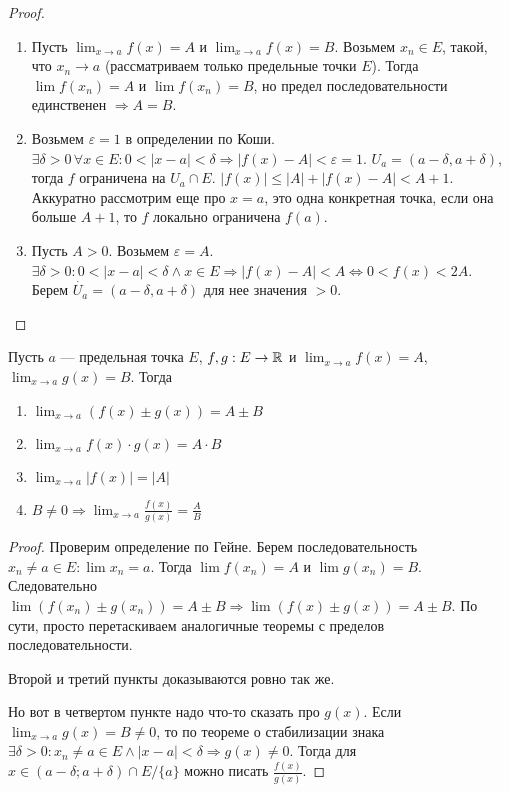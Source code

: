 \begin{proof}
    \slashn
    \begin{enumerate}
        \item Пусть  $\lim_{x\to a} f(x) = A$ и  $\lim_{x\to a} f(x) = B$. Возьмем  $x_n \in E$, такой, что  $x_n \to a$ (рассматриваем только предельные точки $E$). Тогда $\lim f(x_n) = A$ и  $\lim f(x_n) = B$, но предел последовательности единственен $\Rightarrow A=B$.  
	\item Возьмем $\varepsilon = 1$ в определении по Коши.  $\exists \delta > 0\, \forall x \in E: 0 < |x-a| < \delta \Rightarrow |f(x) - A| < \varepsilon = 1$. $U_a = (a - \delta, a + \delta)$, тогда  $f$ ограничена на  $U_a \cap E$.  $|f(x)| \le |A| + |f(x) - A| < A + 1$. Аккуратно рассмотрим еще про $x = a$, это одна конкретная точка, если она больше $A + 1$, то $f$ локально ограничена $f(a)$.
	\item Пусть $A > 0$. Возьмем  $\varepsilon = A$.  $\exists \delta > 0: 0 < |x-a| < \delta \land x \in E \Rightarrow |f(x) - A| < A \iff 0 < f(x) < 2A$. Берем  $\dot{U_a} = (a-\delta, a+\delta)$ для нее значения  $>0$.
    \end{enumerate}
\end{proof}
\begin{theorem}
    Пусть $a$ --- предельная точка  $E$,  $f, g: E \to \mathbb{R}$ и  $\lim_{x\to a} f(x)=A$,  $\lim_{x\to a} g(x)=B$. Тогда 
    \begin{enumerate}
        \item $\lim_{x\to a} (f(x) \pm g(x)) = A \pm B$
        \item $\lim_{x\to a} f(x) \cdot g(x) = A \cdot B$
        \item $\lim_{x\to a} |f(x)| = |A|$
        \item $B \neq 0 \Rightarrow \lim_{x\to a} \frac{f(x)}{g(x)} = \frac{A}{B}$
    \end{enumerate}
\end{theorem}
\begin{proof}
    Проверим определение по Гейне. Берем последовательность $x_n \neq a \in E: \lim x_n = a$. Тогда  $\lim f(x_n) = A$  и  $\lim g(x_n) = B$. Следовательно  $\lim (f(x_n) \pm g(x_n)) = A \pm B \Rightarrow \lim (f(x) \pm g(x)) = A \pm B$. По сути, просто перетаскиваем аналогичные теоремы с пределов последовательности.

    Второй и третий пункты доказываются ровно так же.

    Но вот в четвертом пункте надо что-то сказать про $g(x)$. Если  $\lim_{x\to a} g(x) = B \neq 0$, то по теореме о стабилизации знака $\exists \delta > 0: x_n \neq a \in E \land |x-a| < \delta \Rightarrow g(x) \neq 0$. Тогда для $x \in (a-\delta; a + \delta) \cap E / \{a\}$ можно писать  $\frac{f(x)}{g(x)}$.
\end{proof}

